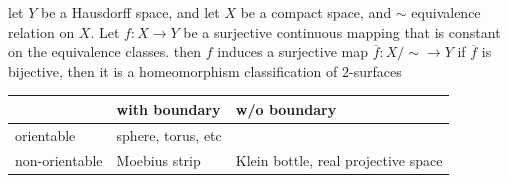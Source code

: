 \begin{outline}
    \1 let $Y$ be a Hausdorff space, and let $X$ be a compact space, and $\sim$ equivalence relation on $X$. Let $f:X\rightarrow Y$ be a surjective continuous mapping that is constant on the equivalence classes. 
        \2 then $f$ induces a surjective map $\overline{f}: X/\sim \rightarrow Y$
        \2 if $\overline{f}$ is bijective, then it is a homeomorphism
    \1 classification of $2$-surfaces
\end{outline}

\begin{table}[h]
    \centering
    \begin{tabular}{m{2.5cm} m{2.5cm} m{5cm}}
        \toprule
         & with boundary & w/o boundary  \\
         \midrule
         orientable & sphere, torus, etc &  \\
         non-orientable & Moebius strip & Klein bottle, real projective space \\
         \bottomrule
    \end{tabular}
\end{table}

